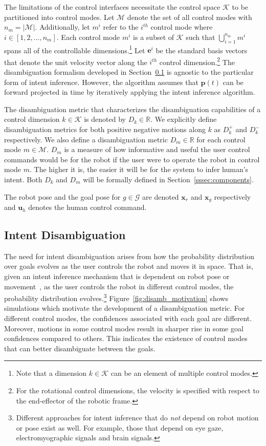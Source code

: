 \documentclass[natbib, twocolumn]{svjour3}          %
\begin{document}
The limitations of the control interfaces necessitate the control space $\mathcal{K}$ to be partitioned into control modes. Let $\mathcal{M}$ denote the set of all control modes with $n_m = \vert\mathcal{M}\vert$. Additionally, let $m^i$ refer to the $i^{th}$ control mode where $i \in [1,2,\dots,n_m]$. Each control mode $m^i$ is a subset of $\mathcal{K}$ such that $\bigcup\limits_{i=1}^{n_m} m^i$ spans all of the controllable dimensions.\footnote{Note that a dimension $k \in \mathcal{K}$ can be an element of multiple control modes.} Let $\boldsymbol{e}^i$ be the standard basis vectors that denote the unit velocity vector along the $i^{th}$ control dimension.\footnote{For the rotational control dimensions, the velocity is specified with respect to the end-effector of the robotic frame.} The disambiguation formalism developed in Section~\ref{ssec:disamb} is agnostic to the particular form of intent inference. However, the algorithm assumes that $\boldsymbol{p}(t)$ can be forward projected in time by iteratively applying the intent inference algorithm. 

The disambiguation metric that characterizes the disambiguation capabilities of a control dimension $k \in \mathcal{K}$ is denoted by $D_k \in \mathbb{R}$. We explicitly define disambiguation metrics for both positive negative motions along $k$ as $D_k^{+}$ and $D_k^{-}$ respectively. We also define a disambiguation metric $D_m \in \mathbb{R}$ for each control mode $m \in \mathcal{M}$. $D_m$ is a measure of how informative and useful the user control commands would be for the robot if the user were to operate the robot in control mode $m$. The higher it is, the easier it will be for the system to infer human's intent. Both $D_k$ and $D_m$ will be formally defined in Section~\ref{sssec:components}.

The robot pose and the goal pose for $g \in \mathcal{G}$ are denoted $\boldsymbol{x}_r$ and $\boldsymbol{x}_g$ respectively and $\boldsymbol{u}_h$ denotes the human control command.
\subsection{Intent Disambiguation}\label{ssec:disamb} 
The need for intent disambiguation arises from how the probability distribution over goals evolves as the user controls the robot and moves it in space. That is, given an intent inference mechanism that is dependent on robot pose or movement~\citep{kelley2008understanding, wang2013probabilistic}, as the user controls the robot in different control modes, the probability distribution evolves.\footnote{Different approaches for intent inference that do \textit{not} depend on robot motion or pose exist as well. For example, those that depend on eye gaze, electromyographic signals and brain signals.} Figure~\ref{fig:disamb_motivation} shows simulations which motivate the development of a disambiguation metric. For different control modes, the confidences associated with each goal are different. Moreover, motions in some control modes result in sharper rise in some goal confidences compared to others. This indicates the existence of control modes that can better disambiguate between the goals. 
\end{document}
